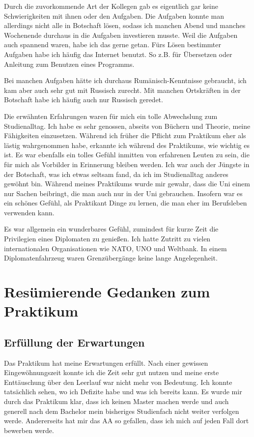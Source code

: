 \documentclass{../../sem_paper}
\begin{document}
Durch die zuvorkommende Art der Kollegen gab es eigentlich gar keine Schwierigkeiten mit ihnen oder den Aufgaben. Die Aufgaben konnte man allerdings nicht alle in Botschaft lösen, sodass ich manchen Abend und manches Wochenende durchaus in die Aufgaben investieren musste. Weil die Aufgaben auch spannend waren, habe ich das gerne getan. Fürs Lösen bestimmter Aufgaben habe ich häufig das Internet benutzt. So z.B. für Übersetzen oder Anleitung zum Benutzen eines Programms.

Bei manchen Aufgaben hätte ich durchaus Rumänisch-Kenntnisse gebraucht, ich kam aber auch sehr gut mit Russisch zurecht. Mit manchen Ortskräften in der Botschaft habe ich häufig auch nur Russisch geredet.

Die erwähnten Erfahrungen waren für mich ein tolle Abwechslung zum Studienalltag. Ich habe es sehr genossen, abseits von Büchern und Theorie, meine Fähigkeiten einzusetzen. Während ich früher die Pflicht zum Praktikum eher als lästig wahrgenommen habe, erkannte ich während des Praktikums, wie wichtig es ist. Es war ebenfalls ein tolles Gefühl inmitten von erfahrenen Leuten zu sein, die für mich als Vorbilder in Erinnerung bleiben werden. Ich war auch der Jüngste in der Botschaft, was ich etwas seltsam fand, da ich im Studienalltag anderes gewöhnt bin. Während meines Praktikums wurde mir gewahr, dass die Uni einem nur Sachen beibringt, die man auch nur in der Uni gebrauchen. Insofern war es ein schönes Gefühl, als Praktikant Dinge zu lernen, die man eher im Berufsleben verwenden kann.

Es war allgemein ein wunderbares Gefühl, zumindest für kurze Zeit die Privilegien eines Diplomaten zu genießen. Ich hatte Zutritt zu vielen internationalen Organisationen wie NATO, UNO und Weltbank. In einem Diplomatenfahrzeug  waren Grenzübergänge keine lange Angelegenheit.  

\newpage
\section{Resümierende Gedanken zum Praktikum}

\subsection{Erfüllung der Erwartungen}
Das Praktikum hat meine Erwartungen erfüllt. Nach einer gewissen Eingewöhnungszeit konnte ich die Zeit sehr gut nutzen und meine erste Enttäuschung über den Leerlauf war nicht mehr von Bedeutung. Ich konnte tatsächlich sehen, wo ich Defizite habe und was ich bereits kann. Es wurde mir durch das Praktikum klar, dass ich keinen Master machen werde und auch generell nach dem Bachelor mein bisheriges Studienfach nicht weiter verfolgen werde. Andererseits hat mir das AA so gefallen, dass ich mich auf jeden Fall dort bewerben werde.
\end{document}
